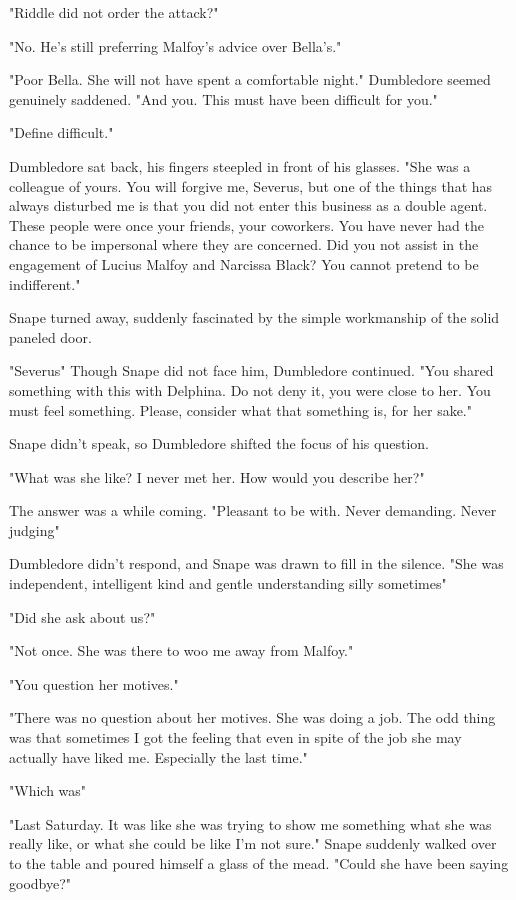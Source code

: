 "Riddle did not order the attack?"

"No. He's still preferring Malfoy's advice over Bella's."

"Poor Bella. She will not have spent a comfortable night." Dumbledore seemed genuinely saddened. "And you. This must have been difficult for you."

"Define difficult."

Dumbledore sat back, his fingers steepled in front of his glasses. "She was a colleague of yours. You will forgive me, Severus, but one of the things that has always disturbed me is that you did not enter this business as a double agent. These people were once your friends, your coworkers. You have never had the chance to be impersonal where they are concerned. Did you not assist in the engagement of Lucius Malfoy and Narcissa Black? You cannot pretend to be indifferent."

Snape turned away, suddenly fascinated by the simple workmanship of the solid paneled door.

"Severus{\el}" Though Snape did not face him, Dumbledore continued. "You shared something with this{\el} with Delphina. Do not deny it, you were{\el} close to her. You must feel something. Please, consider what that something is, for her sake."

Snape didn't speak, so Dumbledore shifted the focus of his question.

"What was she like? I never met her. How would you describe her?"

The answer was a while coming. "Pleasant to be with. Never demanding. Never judging{\el}"

Dumbledore didn't respond, and Snape was drawn to fill in the silence. "She was independent, intelligent{\el} kind and gentle{\el} understanding{\el} silly sometimes{\el}"

"Did she ask about us?"

"Not once. She was there to woo me away from Malfoy."

"You question her motives."

"There was no question about her motives. She was doing a job. The odd thing was that sometimes I got the feeling that even in spite of the job{\el} she may actually have liked me. Especially the last time."

"Which was{\el}"

"Last Saturday. It was like she was trying to show me something{\el} what she was really like, or what she could be like{\el} I'm not sure." Snape suddenly walked over to the table and poured himself a glass of the mead. "Could she have been saying goodbye?"


